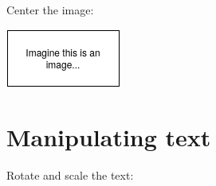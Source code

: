 \documentclass[12pt, letterpaper, oneside]{article}
\begin{document}

Center the image:

\begin{center}
  \includegraphics{image-1.png}
\end{center}

\section{Manipulating text}

Rotate and scale the text:

\end{document}
